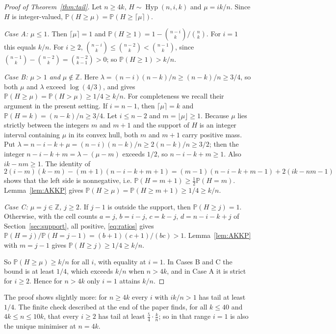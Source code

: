 \documentclass[11pt]{article}
\theoremstyle{remark}
\newcommand{\Z}{\mathbb Z}
\newcommand{\Prb}{\mathbb P}
\newcommand{\Hyp}{\operatorname{Hyp}}
\begin{document}
\begin{proof}[Proof of Theorem~\ref{thm:tail}]
Let \(n\ge4k\), \(H\sim\Hyp(n,i,k)\) and \(\mu=ik/n\). Since \(H\) is
integer-valued, \(\Prb(H\ge\mu)=\Prb(H\ge\lceil\mu\rceil)\).

\emph{Case A: \(\mu\le1\).} Then \(\lceil\mu\rceil=1\) and
\(\Prb(H\ge1)=1-\binom{n-i}{k}/\binom nk\). For \(i=1\) this equals \(k/n\).
For \(i\ge2\), \(\binom{n-i}{k}\le\binom{n-2}{k}<\binom{n-1}{k}\), since
\(\binom{n-1}{k}-\binom{n-2}{k}=\binom{n-2}{k-1}>0\); so \(\Prb(H\ge1)>k/n\).

\emph{Case B: \(\mu>1\) and \(\mu\notin\Z\).} Here
\(\lambda=(n-i)(n-k)/n\ge(n-k)/n\ge3/4\), so both \(\mu\) and \(\lambda\)
exceed \(\log(4/3)\), and \cite[Theorem~3(1)]{AKKP} gives
\(\Prb(H\ge\mu)=\Prb(H>\mu)\ge1/4\ge k/n\). For completeness we recall their
argument in the present setting. If \(i=n-1\), then
\(\lceil\mu\rceil=k\) and \(\Prb(H=k)=(n-k)/n\ge3/4\). Let \(i\le n-2\) and
\(m=\lfloor\mu\rfloor\ge1\). Because \(\mu\) lies strictly between the integers
\(m\) and \(m+1\) and the support of \(H\) is an integer interval containing
\(\mu\) in its convex hull, both \(m\) and \(m+1\) carry positive mass. Put
\(\lambda=n-i-k+\mu=(n-i)(n-k)/n\ge2(n-k)/n\ge3/2\); then the integer
\(n-i-k+m=\lambda-(\mu-m)\) exceeds \(1/2\), so \(n-i-k+m\ge1\). Also
\(ik-nm\ge1\). The identity of \cite[Section~3]{AKKP}
\[
 2(i-m)(k-m)-(m+1)(n-i-k+m+1)=(m-1)(n-i-k+m-1)+2(ik-nm-1)
\]
shows that the left side is nonnegative, i.e.
\(\Prb(H=m+1)\ge\tfrac12\Prb(H=m)\). Lemma~\ref{lem:AKKP} gives
\(\Prb(H\ge\mu)=\Prb(H\ge m+1)\ge1/4\ge k/n\).

\emph{Case C: \(\mu=j\in\Z\), \(j\ge2\).} If \(j-1\) is outside the support,
then \(\Prb(H\ge j)=1\). Otherwise, with the cell counts
\(a=j\), \(b=i-j\), \(c=k-j\), \(d=n-i-k+j\) of Section~\ref{sec:support},
all positive, \eqref{eq:ratios} gives
\(\Prb(H=j)/\Prb(H=j-1)=(b+1)(c+1)/(bc)>1\). Lemma~\ref{lem:AKKP} with
\(m=j-1\) gives \(\Prb(H\ge j)\ge1/4\ge k/n\).

So \(\Prb(H\ge\mu)\ge k/n\) for all \(i\), with equality at \(i=1\). In Cases
B and C the bound is at least \(1/4\), which exceeds \(k/n\) when \(n>4k\), and
in Case A it is strict for \(i\ge2\). Hence for \(n>4k\) only \(i=1\) attains
\(k/n\).
\end{proof}

The proof shows slightly more: for \(n\ge4k\) every \(i\) with
\(ik/n>1\) has tail at least \(1/4\). The finite check
described at the end of the paper finds, for all \(k\le40\) and \(4k\le n\le10k\), that
every \(i\ge2\) has tail at least \(\tfrac54\cdot\tfrac kn\); so in that range
\(i=1\) is also the unique minimiser at \(n=4k\).
\end{document}

